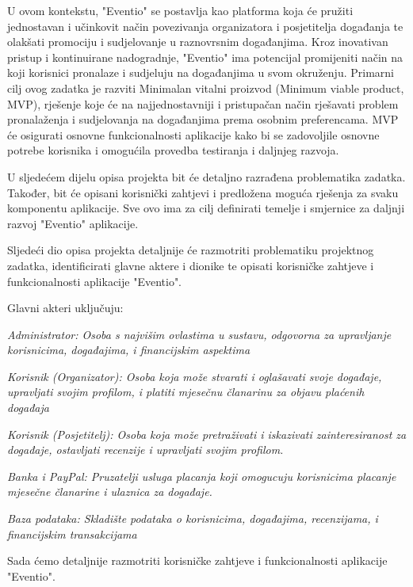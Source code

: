 		U ovom kontekstu, "Eventio" se postavlja kao platforma koja će pružiti jednostavan i učinkovit način povezivanja organizatora i posjetitelja događanja te olakšati promociju i sudjelovanje u raznovrsnim događanjima. Kroz inovativan pristup i kontinuirane nadogradnje, "Eventio" ima potencijal promijeniti način na koji korisnici pronalaze i sudjeluju na događanjima u svom okruženju.
		Primarni cilj ovog zadatka je razviti Minimalan vitalni proizvod (Minimum viable product, MVP), rješenje koje će na najjednostavniji i pristupačan način rješavati problem pronalaženja i sudjelovanja na događanjima prema osobnim preferencama. MVP će osigurati osnovne funkcionalnosti aplikacije kako bi se zadovoljile osnovne potrebe korisnika i omogućila provedba testiranja i daljnjeg razvoja.
		
		U sljedećem dijelu opisa projekta bit će detaljno razrađena problematika zadatka. Također, bit će opisani korisnički zahtjevi i predložena moguća rješenja za svaku komponentu aplikacije. Sve ovo ima za cilj definirati temelje i smjernice za daljnji razvoj "Eventio" aplikacije.
		
		Sljedeći dio opisa projekta detaljnije će razmotriti problematiku projektnog zadatka, identificirati glavne aktere i dionike te opisati korisničke zahtjeve i funkcionalnosti aplikacije "Eventio".
		
		Glavni akteri uključuju:
		\begin{packed_item}
			\item \textit{Administrator: Osoba s najvišim ovlastima u sustavu, odgovorna za upravljanje korisnicima, događajima, i financijskim aspektima}
			\item \textit{Korisnik (Organizator): Osoba koja može stvarati i oglašavati svoje događaje, upravljati svojim profilom, i platiti mjesečnu članarinu za objavu plaćenih događaja}
			\item \textit{Korisnik (Posjetitelj): Osoba koja može pretraživati i iskazivati zainteresiranost za događaje, ostavljati recenzije i upravljati svojim profilom.}
			\item \textit{Banka i PayPal: Pruzatelji usluga placanja koji omogucuju korisnicima placanje mjesečne članarine i ulaznica za događaje.}
			\item \textit{Baza podataka: Skladište podataka o korisnicima, događajima, recenzijama, i financijskim transakcijama}
		\end{packed_item}
		
		Sada ćemo detaljnije razmotriti korisničke zahtjeve i funkcionalnosti aplikacije "Eventio".
		

